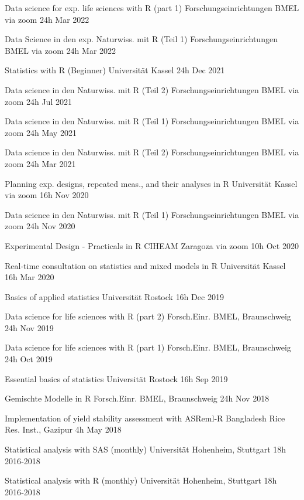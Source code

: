 \documentclass[11pt,a4paper,]{awesome-cv}
\begin{document}
\begin{cvhonors}
\cvhonor
{Data science for exp. life sciences with R (part 1)  }
{Forschungseinrichtungen BMEL via zoom}
{24h}
{Mar 2022  }

\cvhonor
{Data Science in den exp. Naturwiss. mit R (Teil 1)  }
{Forschungseinrichtungen BMEL via zoom}
{24h}
{Mar 2022  }

\cvhonor
{Statistics with R (Beginner)  }
{Universität Kassel}
{24h}
{Dec 2021  }

\cvhonor
{Data science in den Naturwiss. mit R (Teil 2)  }
{Forschungseinrichtungen BMEL via zoom}
{24h}
{Jul 2021  }

\cvhonor
{Data science in den Naturwiss. mit R (Teil 1)  }
{Forschungseinrichtungen BMEL via zoom}
{24h}
{May 2021  }

\cvhonor
{Data science in den Naturwiss. mit R (Teil 2)  }
{Forschungseinrichtungen BMEL via zoom}
{24h}
{Mar 2021  }

\cvhonor
{Planning exp. designs, repeated meas., and their analyses in R  }
{Universität Kassel via zoom}
{16h}
{Nov 2020  }

\cvhonor
{Data science in den Naturwiss. mit R (Teil 1)  }
{Forschungseinrichtungen BMEL via zoom}
{24h}
{Nov 2020  }

\cvhonor
{Experimental Design - Practicals in R  }
{CIHEAM Zaragoza via zoom}
{10h}
{Oct 2020  }

\cvhonor
{Real‑time consultation on statistics and mixed models in R  }
{Universität Kassel}
{16h}
{Mar 2020  }

\cvhonor
{Basics of applied statistics  }
{Universität Rostock}
{16h}
{Dec 2019  }

\cvhonor
{Data science for life sciences with R (part 2)  }
{Forsch.Einr. BMEL, Braunschweig}
{24h}
{Nov 2019  }

\cvhonor
{Data science for life sciences with R (part 1)  }
{Forsch.Einr. BMEL, Braunschweig}
{24h}
{Oct 2019  }

\cvhonor
{Essential basics of statistics  }
{Universität Rostock}
{16h}
{Sep 2019  }

\cvhonor
{Gemischte Modelle in R  }
{Forsch.Einr. BMEL, Braunschweig}
{24h}
{Nov 2018  }

\cvhonor
{Implementation of yield stability assessment with ASReml‑R  }
{Bangladesh Rice Res. Inst., Gazipur}
{4h}
{May 2018  }

\cvhonor
{Statistical analysis with SAS (monthly)  }
{Universität Hohenheim, Stuttgart}
{18h}
{2016‑2018  }

\cvhonor
{Statistical analysis with R (monthly)  }
{Universität Hohenheim, Stuttgart}
{18h}
{2016‑2018  }\end{cvhonors}
\end{document}
